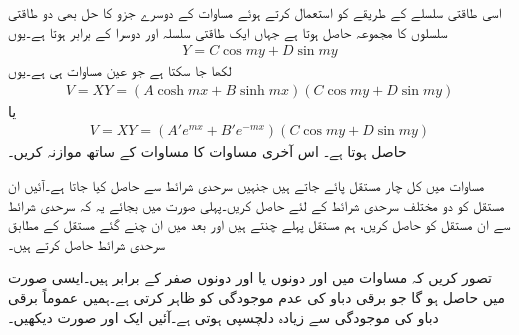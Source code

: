 اسی طاقتی سلسلے کے طریقے کو استعمال کرتے ہوئے مساوات  کے دوسرے جزو کا حل بھی دو طاقتی سلسلوں کا مجموعہ حاصل ہوتا ہے جہاں ایک طاقتی سلسلہ  اور دوسرا  کے برابر ہوتا ہے۔یوں
\begin{align}\label{مساوات_لاپلاس_طاقتی_حل_دو_درجی_کارتیسی}
Y=C\cos my+D\sin my
\end{align}
لکھا جا سکتا ہے جو عین مساوات  ہی ہے۔یوں
\begin{align}\label{مساوات_لاپلاس_اندازہ_ت}
V=XY=\left( A \cosh mx+B \sinh mx\right) \left(C \cos m y+D \sin m y \right)
\end{align}
یا 
\begin{align}\label{مساوات_لاپلاس_اندازہ_ٹ}
V=XY=\left(A' e^{mx}+B' e^{-m x} \right) \left(C \cos m y+D \sin m y \right)
\end{align}
حاصل ہوتا ہے۔ اس آخری مساوات کا مساوات  کے ساتھ موازنہ کریں۔

مساوات  میں کل چار مستقل پائے جاتے ہیں جنہیں سرحدی شرائط سے حاصل کیا جاتا ہے۔آئیں ان مستقل کو دو مختلف سرحدی شرائط کے لئے حاصل کریں۔پہلی صورت میں بجائے یہ کہ سرحدی شرائط سے ان مستقل کو حاصل کریں، ہم مستقل پہلے چنتے ہیں اور بعد میں ان چنے گئے مستقل کے مطابق سرحدی شرائط حاصل کرتے ہیں۔

تصور کریں کہ مساوات  میں  اور  دونوں یا  اور  دونوں صفر کے برابر ہیں۔ایسی صورت میں  حاصل ہو گا جو برقی دباو کی عدم موجودگی کو ظاہر کرتی ہے۔ہمیں عموماً برقی دباو کی موجودگی سے زیادہ دلچسپی ہوتی ہے۔آئیں ایک اور صورت دیکھیں۔

